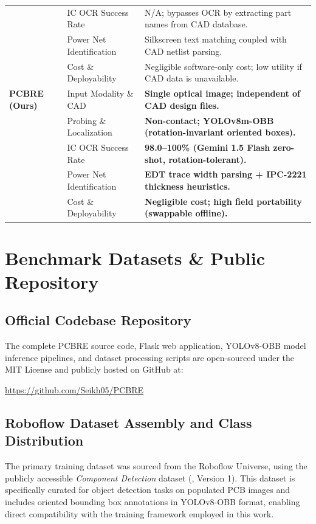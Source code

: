 \documentclass[12pt,a4paper]{report}
\begin{document}
\begin{table}[H]
\begin{tabular}{@{}llp{8.5cm}@{}}
    & IC OCR Success Rate & N/A; bypasses OCR by extracting part names from CAD database. \\
    & Power Net Identification & Silkscreen text matching coupled with CAD netlist parsing. \\
    & Cost \& Deployability & Negligible software-only cost; low utility if CAD data is unavailable. \\
    \midrule
    \textbf{PCBRE (Ours)} & Input Modality \& CAD & \textbf{Single optical image; independent of CAD design files.} \\
    & Probing \& Localization & \textbf{Non-contact; YOLOv8m-OBB (rotation-invariant oriented boxes).} \\
    & IC OCR Success Rate & \textbf{98.0--100\% (Gemini 1.5 Flash zero-shot, rotation-tolerant).} \\
    & Power Net Identification & \textbf{EDT trace width parsing + IPC-2221 thickness heuristics.} \\
    & Cost \& Deployability & \textbf{Negligible cost; high field portability (swappable offline).} \\
    \bottomrule
  \end{tabular}
\end{table}

\section{Benchmark Datasets \& Public Repository}
\label{sec:datasets}

\subsection{Official Codebase Repository}
\label{subsec:github_repo}

The complete PCBRE source code, Flask web application, YOLOv8-OBB model inference pipelines, and dataset processing scripts are open-sourced under the MIT License and publicly hosted on GitHub at:
\begin{center}
\url{https://github.com/Seikh05/PCBRE}
\end{center}

\subsection{Roboflow Dataset Assembly and Class Distribution}
\label{subsec:roboflow_dataset}

The primary training dataset was sourced from the Roboflow Universe, using the publicly accessible \textit{Component Detection} dataset (, Version 1). This dataset is specifically curated for object detection tasks on populated PCB images and includes oriented bounding box annotations in YOLOv8-OBB format, enabling direct compatibility with the training framework employed in this work.
\end{document}
